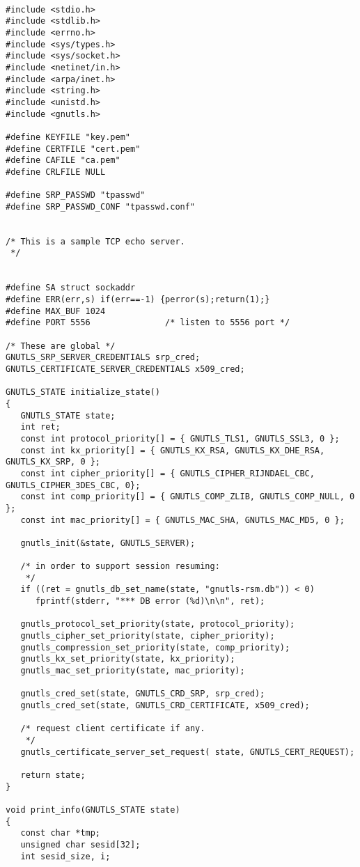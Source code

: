 \begin{verbatim}

#include <stdio.h>
#include <stdlib.h>
#include <errno.h>
#include <sys/types.h>
#include <sys/socket.h>
#include <netinet/in.h>
#include <arpa/inet.h>
#include <string.h>
#include <unistd.h>
#include <gnutls.h>

#define KEYFILE "key.pem"
#define CERTFILE "cert.pem"
#define CAFILE "ca.pem"
#define CRLFILE NULL

#define SRP_PASSWD "tpasswd"
#define SRP_PASSWD_CONF "tpasswd.conf"


/* This is a sample TCP echo server.
 */


#define SA struct sockaddr
#define ERR(err,s) if(err==-1) {perror(s);return(1);}
#define MAX_BUF 1024
#define PORT 5556               /* listen to 5556 port */

/* These are global */
GNUTLS_SRP_SERVER_CREDENTIALS srp_cred;
GNUTLS_CERTIFICATE_SERVER_CREDENTIALS x509_cred;

GNUTLS_STATE initialize_state()
{
   GNUTLS_STATE state;
   int ret;
   const int protocol_priority[] = { GNUTLS_TLS1, GNUTLS_SSL3, 0 };
   const int kx_priority[] = { GNUTLS_KX_RSA, GNUTLS_KX_DHE_RSA, GNUTLS_KX_SRP, 0 };
   const int cipher_priority[] = { GNUTLS_CIPHER_RIJNDAEL_CBC, GNUTLS_CIPHER_3DES_CBC, 0};
   const int comp_priority[] = { GNUTLS_COMP_ZLIB, GNUTLS_COMP_NULL, 0 };
   const int mac_priority[] = { GNUTLS_MAC_SHA, GNUTLS_MAC_MD5, 0 };

   gnutls_init(&state, GNUTLS_SERVER);

   /* in order to support session resuming:
    */
   if ((ret = gnutls_db_set_name(state, "gnutls-rsm.db")) < 0)
      fprintf(stderr, "*** DB error (%d)\n\n", ret);

   gnutls_protocol_set_priority(state, protocol_priority);
   gnutls_cipher_set_priority(state, cipher_priority);
   gnutls_compression_set_priority(state, comp_priority);
   gnutls_kx_set_priority(state, kx_priority);
   gnutls_mac_set_priority(state, mac_priority);

   gnutls_cred_set(state, GNUTLS_CRD_SRP, srp_cred);
   gnutls_cred_set(state, GNUTLS_CRD_CERTIFICATE, x509_cred);

   /* request client certificate if any.
    */
   gnutls_certificate_server_set_request( state, GNUTLS_CERT_REQUEST);
   
   return state;
}

void print_info(GNUTLS_STATE state)
{
   const char *tmp;
   unsigned char sesid[32];
   int sesid_size, i;


\end{verbatim}
